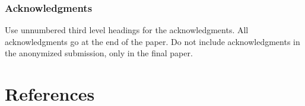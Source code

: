 \documentclass{article}
\begin{document}
\subsubsection*{Acknowledgments}

Use unnumbered third level headings for the acknowledgments. All
acknowledgments go at the end of the paper. Do not include
acknowledgments in the anonymized submission, only in the final paper.

\section*{References}



\end{document}

